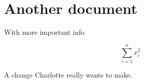 \documentclass{article}
\begin{document}
\section{Another document}

With more important info

\begin{equation}
\sum_{i = 1}^{n} x_i^2
\end{equation}

A change Charlotte really wants to make.
\end{document}

